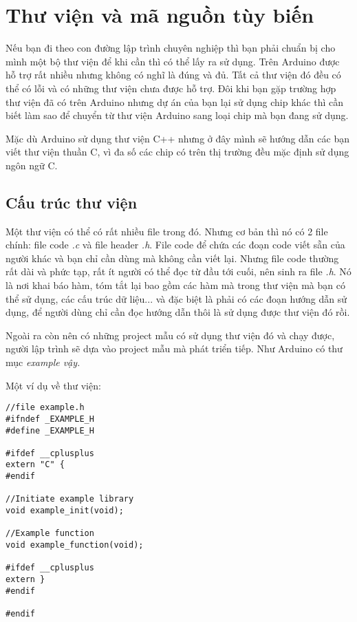 \chapter{Thư viện và mã nguồn tùy biến}

Nếu bạn đi theo con đường lập trình chuyên nghiệp thì bạn phải chuẩn bị cho mình một bộ thư viện để khi cần thì có thể lấy ra sử dụng. Trên Arduino được hỗ trợ rất nhiều nhưng không có nghĩ là đúng và đủ. Tất cả thư viện đó đều có thể có lỗi và có những thư viện chưa được hỗ trợ. Đôi khi bạn gặp trường hợp thư viện đã có trên Arduino nhưng dự án của bạn lại sử dụng chip khác thì cần biết làm sao để chuyển từ thư viện Arduino sang loại chip mà bạn đang sử dụng.

Mặc dù Arduino sử dụng thư viện C++ nhưng ở đây mình sẽ hướng dẫn các bạn viết thư viện thuần C, vì đa số các chip có trên thị trường đều mặc định sử dụng ngôn ngữ C.

\section{Cấu trúc thư viện}

Một thư viện có thể có rất nhiều file trong đó. Nhưng cơ bản thì nó có 2 file chính: file code \textit{.c} và file header \textit{.h}. File code để chứa các đoạn code viết sẵn của người khác và bạn chỉ cần dùng mà không cần viết lại. Nhưng file code thường rất dài và phức tạp, rất ít người có thể đọc từ đầu tới cuối, nên sinh ra file \textit{.h}. Nó là nơi khai báo hàm, tóm tắt lại bao gồm các hàm mà trong thư viện mà bạn có thể sử dụng, các cấu trúc dữ liệu... và đặc biệt là phải có các đoạn hướng dẫn sử dụng, để người dùng chỉ cần đọc hướng dẫn thôi là sử dụng được thư viện đó rồi.

Ngoài ra còn nên có những project mẫu có sử dụng thư viện đó và chạy được, người lập trình sẽ dựa vào project mẫu mà phát triển tiếp. Như Arduino có thư mục \it{example} vậy.

Một ví dụ về thư viện:
\begin{lstlisting}
//file example.h
#ifndef _EXAMPLE_H
#define _EXAMPLE_H

#ifdef __cplusplus
extern "C" {
#endif

//Initiate example library 
void example_init(void);

//Example function
void example_function(void);

#ifdef __cplusplus
extern }
#endif

#endif
\end{lstlisting}

